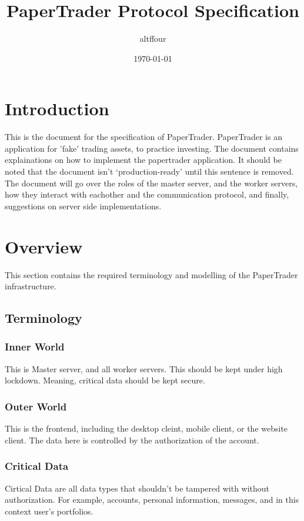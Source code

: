 \documentclass[a4paper]{article}
\title{PaperTrader Protocol Specification}
\author{altffour}
\date{\today}
\begin{document}
\maketitle
\tableofcontents
\newpage

\section{Introduction}
This is the document for the specification of PaperTrader. PaperTrader is an
application for 'fake' trading assets, to practice investing. The document
contains explainations on how to implement the papertrader application. It 
should be noted that the document isn't `production-ready' until this sentence 
is removed. The document will go over the roles of the master server, and the
worker servers, how they interact with eachother and the communication protocol,
and finally, suggestions on server side implementations.

\section{Overview}
This section contains the required terminology and modelling of the PaperTrader
infrastructure.

\subsection{Terminology}

\subsubsection{Inner World}
This is Master server, and all worker servers. This should be kept under high
lockdown. Meaning, critical data should be kept secure.

\subsubsection{Outer World}
This is the frontend, including the desktop cleint, mobile client, or the
website client. The data here is controlled by the authorization of the account.

\subsubsection{Critical Data}
Cirtical Data are all data types that shouldn't be tampered with without
authorization. For example, accounts, personal information, messages, and in
this context user's portfolios.
\end{document}
